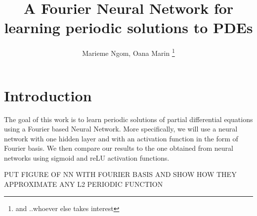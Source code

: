 \documentclass[11pt]{article}
\begin{document}

\title{A Fourier Neural Network for learning periodic solutions to PDEs}
\author{Marieme Ngom, Oana Marin \footnote{and ..whoever else takes interest}}
\maketitle
\begin{abstract}

\end{abstract}




\linenumbers

\section{Introduction}
The goal of this work is to learn periodic solutions of partial differential equations using a Fourier based Neural Network. More specifically, we will use a neural network with one hidden layer and with an activation function in the form of Fourier basis. We then compare our results to the one obtained from neural networks using sigmoid and reLU activation functions.

PUT FIGURE OF NN WITH FOURIER BASIS AND SHOW HOW THEY APPROXIMATE ANY L2 PERIODIC  FUNCTION






\end{document}
